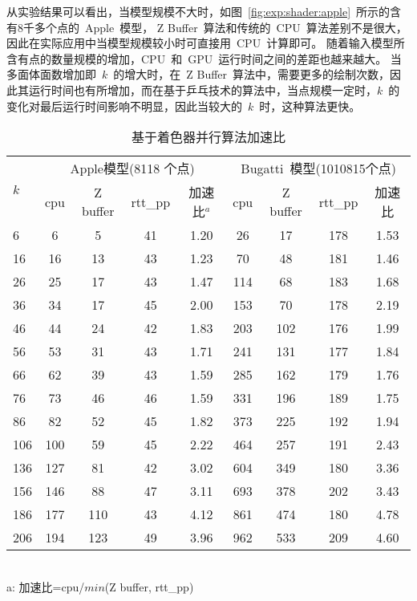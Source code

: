 从实验结果可以看出，当模型规模不大时，如图~\ref{fig:exp:shader:apple}~所示的含有8千多个点的~Apple~模型，
Z Buffer~算法和传统的~CPU~算法差别不是很大，因此在实际应用中当模型规模较小时可直接用~CPU~计算即可。
随着输入模型所含有点的数量规模的增加，CPU~和~GPU~运行时间之间的差距也越来越大。
当多面体面数增加即~$k$~的增大时，在~Z Buffer~算法中，需要更多的绘制次数，因此其运行时间也有所增加，而在基于乒乓技术的算法中，当点规模一定时，$k$~的变化对最后运行时间影响不明显，因此当较大的~$k$~时，这种算法更快。

\begin{table}[htbp]
\centering
\caption{基于着色器并行算法加速比}
\label{tab:exper:shadertime}
\begin{minipage}[t]{0.8\textwidth}
  \begin{tabular}{p{1.5cm}<{\centering}cccc cccc} %
  \toprule[1.5pt]
  \multirow{2}{*}{$k$} & \multicolumn{4}{c}{Apple模型(8118 个点)} &
  \multicolumn{4}{c}{Bugatti~模型(1010815个点)}\\
  \cmidrule(lr){2-5}\cmidrule(lr){6-9}
  ~&cpu & Z buffer  & rtt\_pp & 加速比$^{a}$ & cpu  & Z buffer& rtt\_pp& 加速比 \\
  \midrule[1pt]
 6	 & 6 	& 5 	& 41 &	1.20 &	26	& 17	&178  &	1.53 \\
16	 & 16	& 13	& 43 &	1.23 &	70	& 48	&181  &	1.46 \\
26	 & 25	& 17	& 43 &	1.47 &	114	& 68	&183  &	1.68 \\
36	 & 34	& 17	& 45 &	2.00 &	153	& 70	&178  &	2.19 \\
46	 & 44	& 24	& 42 &	1.83 &	203	& 102	&176  &	1.99 \\
56	 & 53	& 31	& 43 &	1.71 &	241	& 131	&177  &	1.84 \\
66	 & 62	& 39	& 43 &	1.59 &	285	& 162	&179  &	1.76 \\
76	 & 73	& 46	& 46 &	1.59 &	331	& 196	&189  &	1.75 \\
86	 & 82	& 52	& 45 &	1.82 &	373	& 225	&192  &	1.94 \\
106	 & 100	& 59	& 45 &	2.22 &	464	& 257	&191  &	2.43 \\
136	 & 127	& 81	& 42 &	3.02 &	604	& 349	&180  &	3.36 \\
156	 & 146	& 88	& 47 &	3.11 &	693	& 378	&202  &	3.43 \\
186	 & 177	& 110	& 43 &	4.12 &	861	& 474	&180  &	4.78 \\
206	 & 194	& 123	& 49 &	3.96 &	962	& 533	&209  &	4.60 \\
  \bottomrule[1.5pt]
\end{tabular}\\[2pt]
  \footnotesize a: 加速比=cpu/$min$(Z buffer, rtt\_pp)
\end{minipage}
\end{table}

